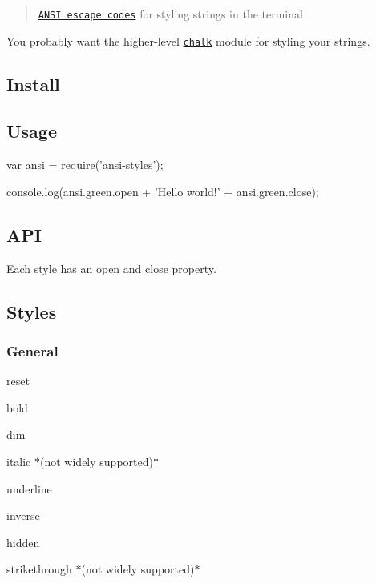 \begin{quote}
\href{http://en.wikipedia.org/wiki/ANSI_escape_code#Colors_and_Styles}{\tt A\+N\+SI escape codes} for styling strings in the terminal \end{quote}


You probably want the higher-\/level \href{https://github.com/sindresorhus/chalk}{\tt chalk} module for styling your strings.



\subsection*{Install}




\subsection*{Usage}


\begin{DoxyCode}
var ansi = require('ansi-styles');

console.log(ansi.green.open + 'Hello world!' + ansi.green.close);
\end{DoxyCode}


\subsection*{A\+PI}

Each style has an {\ttfamily open} and {\ttfamily close} property.

\subsection*{Styles}

\subsubsection*{General}


\begin{DoxyItemize}
\item {\ttfamily reset}
\item {\ttfamily bold}
\item {\ttfamily dim}
\item {\ttfamily italic} $\ast$(not widely supported)$\ast$
\item {\ttfamily underline}
\item {\ttfamily inverse}
\item {\ttfamily hidden}
\item {\ttfamily strikethrough} $\ast$(not widely supported)$\ast$
\end{DoxyItemize}

